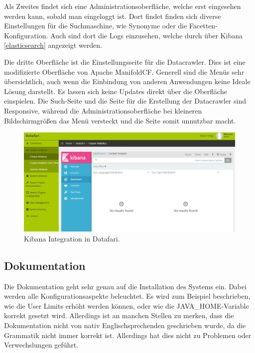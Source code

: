 Als Zweites findet sich eine Administrationsoberfläche, welche erst eingesehen werden kann, sobald man eingeloggt ist. Dort findet finden sich diverse Einstellungen für die Suchmaschine, wie Synonyme oder die Facetten-Konfiguration. Auch sind dort die Logs einzusehen, welche durch über Kibana \ref{elasticsearch} angezeigt werden. 

Die dritte Oberfläche ist die Einstellungsseite für die Datacrawler. Dies ist eine modifizierte Oberfläche von Apache ManifoldCF. Generell sind die Menüs sehr übersichtlich, auch wenn die Einbindung von anderen Anwendungen keine Ideale Lösung darstellt. Es lassen sich keine Updates direkt über die Oberfläche einspielen.
Die Such-Seite und die Seite für die Erstellung der Datacrawler sind Responsive, während die Administrationsoberfläche bei kleineren Bildschirmgrößen das Menü versteckt und die Seite somit unnutzbar macht.

\begin{figure}
	\centering
	\includegraphics[width=1\linewidth]{images/datafari_kibana.png}
	\caption{Kibana Integration in Datafari.}
	\label{img:datafariKibana}
\end{figure}

\subsection{Dokumentation}

Die Dokumentation geht sehr genau auf die Installation des Systems ein. Dabei werden alle Konfigurationsaspekte beleuchtet. Es wird zum Beispiel beschrieben, wie die User Limits erhöht werden können, oder wie die JAVA\_HOME-Variable korrekt gesetzt wird. Allerdings ist an manchen Stellen zu merken, dass die Dokumentation nicht von nativ Englischsprechenden geschrieben wurde, da die Grammatik nicht immer korrekt ist. Allerdings hat dies nicht zu Problemen oder Verwechslungen geführt.

